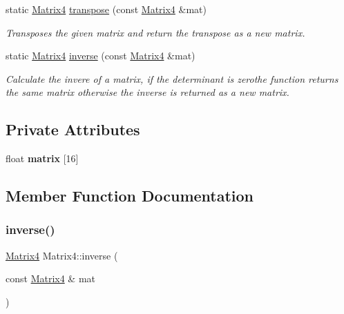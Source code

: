 \begin{DoxyCompactItemize}
static \mbox{\hyperlink{class_matrix4}{Matrix4}} \mbox{\hyperlink{class_matrix4_ab970165b164d6bebbafae4004b80f7b3}{transpose}} (const \mbox{\hyperlink{class_matrix4}{Matrix4}} \&mat)
\begin{DoxyCompactList}\small\item\em Transposes the given matrix and return the transpose as a new matrix. \end{DoxyCompactList}\item 
static \mbox{\hyperlink{class_matrix4}{Matrix4}} \mbox{\hyperlink{class_matrix4_ac023c2fde9c362babf91761f97d5b814}{inverse}} (const \mbox{\hyperlink{class_matrix4}{Matrix4}} \&mat)
\begin{DoxyCompactList}\small\item\em Calculate the invere of a matrix, if the determinant is zerothe function returns the same matrix otherwise the inverse is returned as a new matrix. \end{DoxyCompactList}\end{DoxyCompactItemize}
\subsection*{Private Attributes}
\begin{DoxyCompactItemize}
\item 
\mbox{\label{class_matrix4_a9e3075f101822993aae842e61c0eb529}} 
float {\bfseries matrix} \mbox{[}16\mbox{]}
\end{DoxyCompactItemize}


\subsection{Member Function Documentation}
\mbox{\label{class_matrix4_ac023c2fde9c362babf91761f97d5b814}} 
\subsubsection{\texorpdfstring{inverse()}{inverse()}}
{\footnotesize\ttfamily \mbox{\hyperlink{class_matrix4}{Matrix4}} Matrix4\+::inverse (\begin{DoxyParamCaption}\item[{const \mbox{\hyperlink{class_matrix4}{Matrix4}} \&}]{mat }\end{DoxyParamCaption})\hspace{0.3cm}{\ttfamily [static]}}



